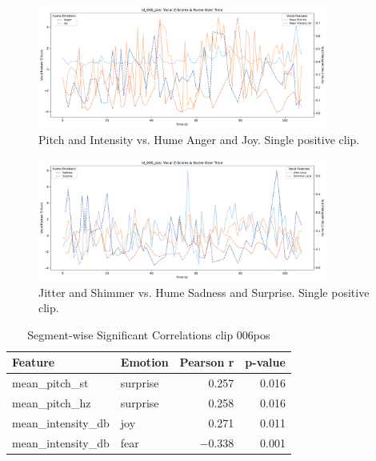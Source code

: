 \medskip

\begin{figure}[H]
    \centering
    
    \includegraphics[width=0.85\textwidth]{png/results/rq1_new/006_pos_use_anger-joy.pdf}
    \caption{Pitch and Intensity vs. Hume Anger and Joy. Single positive clip.}
    \label{fig:006_pos-anger-joy}
\end{figure}

\begin{figure}[H]
    \centering
    \includegraphics[width=0.85\textwidth]{png/results/rq1_new/006_pos_use-sadn-surp.pdf} 
    \caption{Jitter and Shimmer vs. Hume Sadness and Surprise. Single positive clip.}
    \label{fig:006_pos-surp-sadn}
\end{figure}
    
\begin{table}[H]
    \centering
    \begin{tabular}{llrr}
        \toprule
        \textbf{Feature}         & \textbf{Emotion} & \textbf{Pearson r} & \textbf{p-value} \\
        \midrule
        mean\_pitch\_st          & surprise         & 0.257              & 0.016            \\
        mean\_pitch\_hz          & surprise         & 0.258              & 0.016            \\
        mean\_intensity\_db      & joy              & 0.271              & 0.011            \\
        mean\_intensity\_db      & fear             & $-0.338$           & 0.001            \\
        \bottomrule
    \end{tabular}
    \caption{Segment-wise Significant Correlations clip 006pos}
    \label{tab:segcorr_significant}
\end{table}

